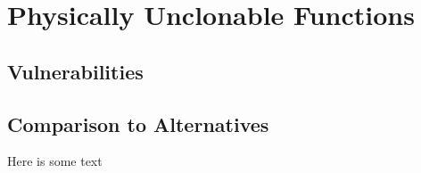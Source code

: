 
\chapter{Physically Unclonable Functions}
\label{chapter:pufoverview}

\section{Vulnerabilities}


\section{Comparison to Alternatives}
Here is some text

